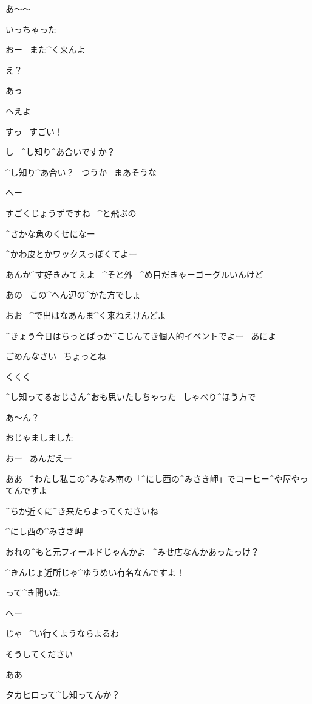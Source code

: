 \page[57]
\A あ〜〜

\A いっちゃった

\Y おー
\ また^{く}{来}んよ

\A え？

\A あっ

\page
\Y へえよ

\A すっ
\ すごい！

\A し
\ ^{し}{知}り^{あ}{合}いですか？

\Y ^{し}{知}り^{あ}{合}い？
\ つうか
\ まあそうな

\page
\A へー

\page
\A すごくじょうずですね
\ ^{と}{飛}ぶの

\Y ^{さかな}{魚}のくせになー

\Y ^{かわ}{皮}とかワックスっぽくてよー

\Y あんか^{す}{好}きみてえよ
\ ^{そと}{外}
\ ^{め}{目}だきゃーゴーグルいんけど

\page
\A あの
\ この^{へん}{辺}の^{かた}{方}でしょ

\Y おお
\ ^{で}{出}はなあんま^{く}{来}ねえけんどよ

\Y ^{きょう}{今日}はちっとばっか^{こじんてき}{個人的}イベントでよー
\ あによ

\A ごめんなさい
\ ちょっとね

\A くくく

\A ^{し}{知}ってるおじさん^{おも}{思}いたしちゃった
\ しゃべり^{ほう}{方}で

\Y あ〜ん？

\page
\A おじゃましました

\Y おー
\ あんだえー

\A ああ
\ ^{わたし}{私}この^{みなみ}{南}の「^{にし}{西}の^{みさき}{岬}」でコーヒー^{や}{屋}やってんですよ

\A ^{ちか}{近}くに^{き}{来}たらよってくださいね

\page
\Y ^{にし}{西}の^{みさき}{岬}

\Y おれの^{もと}{元}フィールドじゃんかよ
\ ^{みせ}{店}なんかあったっけ？

\A ^{きんじょ}{近所}じゃ^{ゆうめい}{有名}なんですよ！

\A って^{き}{聞}いた

\Y へー

\Y じゃ
\ ^{い}{行}くようならよるわ

\A そうしてください

\Y ああ

\page
\Y タカヒロって^{し}{知}ってんか？


